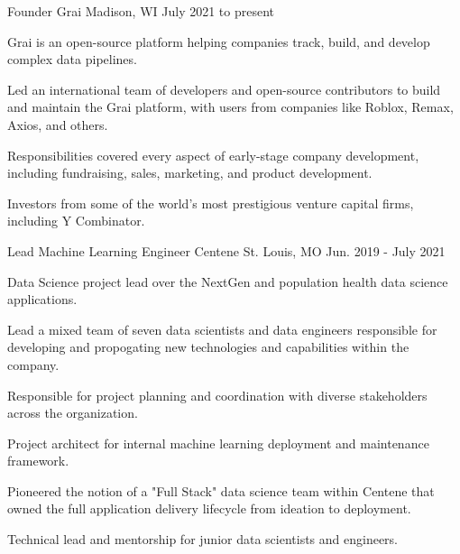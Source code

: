 

\begin{cventries}
  \cventry
    {Founder} %
    {Grai} %
    {Madison, WI} %
    {July 2021 to present} %
    {
      \begin{cvitems} %
        \item {Grai is an open-source platform helping companies track, build, and develop complex data pipelines.}
        \item {Led an international team of developers and open-source contributors to build and maintain the Grai platform, with users from companies like Roblox, Remax, Axios, and others.}
        \item {Responsibilities covered every aspect of early-stage company development, including fundraising, sales, marketing, and product development.}
        \item {Investors from some of the world’s most prestigious venture capital firms, including Y Combinator.}
      \end{cvitems}
    }

  \cventry
    {Lead Machine Learning Engineer} %
    {Centene} %
    {St. Louis, MO} %
    {Jun. 2019 - July 2021} %
    {
      \begin{cvitems} %
        \item {Data Science project lead over the NextGen and population health data science applications.}
        \item {Lead a mixed team of seven data scientists and data engineers responsible for developing and propogating new technologies and capabilities within the company.}
        \item {Responsible for project planning and coordination with diverse stakeholders across the organization.}
        \item {Project architect for internal machine learning deployment and maintenance framework.}
        \item {Pioneered the notion of a "Full Stack" data science team within Centene that owned the full application delivery lifecycle from ideation to deployment.}
        \item {Technical lead and mentorship for junior data scientists and engineers.}
      \end{cvitems}
    }


\end{cventries}
